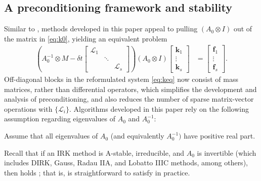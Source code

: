 \documentclass[review]{siamart}
\begin{document}


\subsection{A preconditioning framework and stability}\label{sec:intro:stab}

Similar to \cite{pazner17,irk1}, methods developed in this paper appeal
to pulling $(A_0\otimes I)$ out of the matrix in \eqref{eq:k0}, yielding
an equivalent problem
%
\begin{align}\label{eq:keq}
\left( A_0^{-1}\otimes M - \delta t \begin{bmatrix} \mathcal{L}_1  & \\ & \ddots \\ && \mathcal{L}_s\end{bmatrix}\right)
	(A_0\otimes I)	\begin{bmatrix} \mathbf{k}_1 \\ \vdots \\ \mathbf{k}_s \end{bmatrix}
& = \begin{bmatrix} \mathbf{f}_1 \\ \vdots \\ \mathbf{f}_s \end{bmatrix}.
\end{align}
%
Off-diagonal blocks in the reformulated system \eqref{eq:keq} now consist of
mass matrices, rather than differential operators, which simplifies the
development and analysis of preconditioning, and also reduces the number
of sparse matrix-vector operations with $\{\mathcal{L}_i\}$. Algorithms
developed in this paper rely on the following assumption regarding
eigenvalues of $A_0$ and $A_0^{-1}$:
%
\begin{assumption}\label{ass:eig}
Assume that all eigenvalues of $A_0$ (and equivalently $A_0^{-1})$ have positive real part.
\end{assumption}
%
Recall that if an IRK method is A-stable, irreducible, and $A_0$ is invertible
(which includes DIRK, Gauss, Radau IIA, and Lobatto IIIC methods, among others),
then  holds \cite{hairer96}; that is,  is
straightforward to satisfy in practice.
\end{document}
